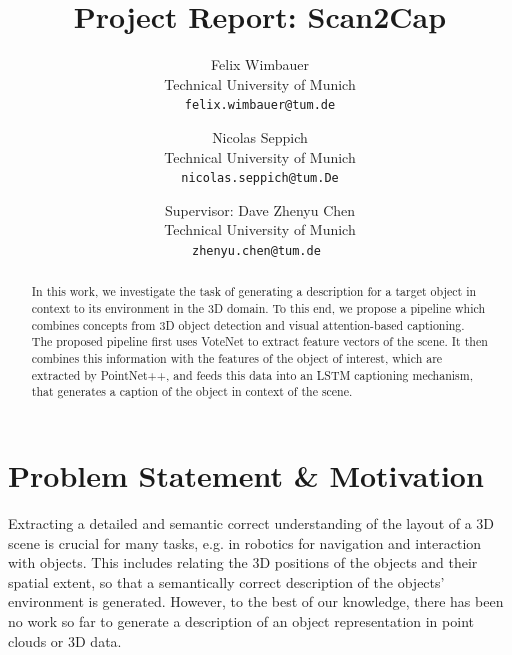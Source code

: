 \documentclass[10pt,twocolumn,letterpaper]{article}
\begin{document}
\title{Project Report: Scan2Cap}

\author{Felix Wimbauer\\
Technical University of Munich\\
{\tt\small felix.wimbauer@tum.de}
\and
Nicolas Seppich\\
Technical University of Munich\\
{\tt\small nicolas.seppich@tum.De}
\and
\small
Supervisor: Dave Zhenyu Chen\\
\small
Technical University of Munich\\
{\tt\small zhenyu.chen@tum.de }
}

\maketitle

\begin{abstract}
In this work, we investigate the task of generating a description for a target object in context to its environment in the 3D domain. To this end, we propose a pipeline which combines concepts from 3D object detection and visual attention-based captioning. The proposed pipeline first uses VoteNet to extract feature vectors of the scene. It then combines this information with the features of the object of interest, which are extracted by PointNet++, and feeds this data into an LSTM captioning mechanism, that generates a caption of the object in context of the scene.
   
\end{abstract}

\section{Problem Statement \& Motivation}

Extracting a detailed and semantic correct understanding of the layout of a 3D scene is crucial for many tasks, e.g. in robotics for navigation and interaction with objects. This includes relating the 3D positions of the objects and their spatial extent, so that a semantically correct description of the objects' environment is generated.
However, to the best of our knowledge, there has been no work so far to generate a description of an object representation in point clouds or 3D data.
\end{document}
